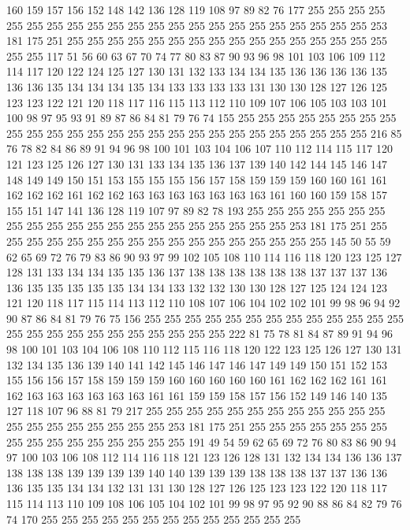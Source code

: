 160 159 157 156 152 148 142 136 128 119 108 97 89 82 76 177 255 255 255 255
255 255 255 255 255 255 255 255 255 255 255 255 255 255 255 255 255 255 253 181
175 251 255 255 255 255 255 255 255 255 255 255 255 255 255 255 255 255 255 255
117 51 56 60 63 67 70 74 77 80 83 87 90 93 96 98 101 103 106 109
112 114 117 120 122 124 125 127 130 131 132 133 134 134 135 136 136 136 136 135
136 136 135 134 134 134 135 134 133 133 133 133 131 130 130 128 127 126 125 123
123 122 121 120 118 117 116 115 113 112 110 109 107 106 105 103 103 101 100 98
97 95 93 91 89 87 86 84 81 79 76 74 155 255 255 255 255 255 255 255
255 255 255 255 255 255 255 255 255 255 255 255 255 255 255 255 255 255 255 216
85 76 78 82 84 86 89 91 94 96 98 100 101 103 104 106 107 110 112 114
115 117 120 121 123 125 126 127 130 131 133 134 135 136 137 139 140 142 144 145
146 147 148 149 149 150 151 153 155 155 155 156 157 158 159 159 159 160 160 161
161 162 162 162 161 162 162 163 163 163 163 163 163 163 161 160 160 159 158 157
155 151 147 141 136 128 119 107 97 89 82 78 193 255 255 255 255 255 255 255
255 255 255 255 255 255 255 255 255 255 255 255 255 255 253 181 175 251 255 255
255 255 255 255 255 255 255 255 255 255 255 255 255 255 255 145 50 55 59 62
65 69 72 76 79 83 86 90 93 97 99 102 105 108 110 114 116 118 120 123
125 127 128 131 133 134 134 135 135 136 137 138 138 138 138 138 138 137 137 137
136 136 135 135 135 135 135 134 134 133 132 132 130 130 128 127 125 124 124 123
121 120 118 117 115 114 113 112 110 108 107 106 104 102 102 101 99 98 96 94
92 90 87 86 84 81 79 76 75 156 255 255 255 255 255 255 255 255 255 255
255 255 255 255 255 255 255 255 255 255 255 255 255 255 222 81 75 78 81 84
87 89 91 94 96 98 100 101 103 104 106 108 110 112 115 116 118 120 122 123
125 126 127 130 131 132 134 135 136 139 140 141 142 145 146 147 146 147 149 149
150 151 152 153 155 156 156 157 158 159 159 159 160 160 160 160 160 161 162 162
162 161 161 162 163 163 163 163 163 163 161 161 159 159 158 157 156 152 149 146
140 135 127 118 107 96 88 81 79 217 255 255 255 255 255 255 255 255 255 255
255 255 255 255 255 255 255 255 255 255 253 181 175 251 255 255 255 255 255 255
255 255 255 255 255 255 255 255 255 255 191 49 54 59 62 65 69 72 76 80
83 86 90 94 97 100 103 106 108 112 114 116 118 121 123 126 128 131 132 134
134 136 136 137 138 138 138 139 139 139 139 140 140 139 139 139 138 138 138 137
137 136 136 136 135 135 134 134 132 131 131 130 128 127 126 125 123 123 122 120
118 117 115 114 113 110 109 108 106 105 104 102 101 99 98 97 95 92 90 88
86 84 82 79 76 74 170 255 255 255 255 255 255 255 255 255 255 255 255 255
